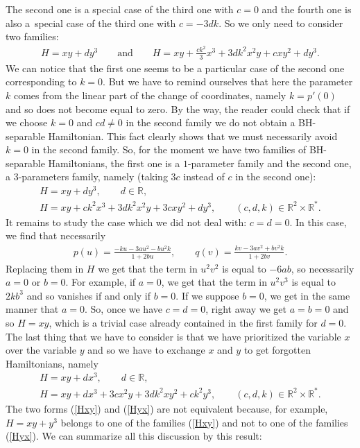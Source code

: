 \documentclass[10pt,a4paper]{amsart}
\numberwithin{equation}{section}
\begin{document}
The second one is a special case of the third one with $c=0$ and the fourth one is also a~special case of the third one with $c=-3dk$. So we only need to consider two families:
\begin{gather*}
H=xy+dy^3\qquad \text{and}\qquad H=xy+\frac{ck^2}{3}x^3+3dk^2x^2y+cxy^2+dy^3.
\end{gather*}
We can notice that the first one seems to be a particular case of the second one corresponding to $k=0$. But we have to remind ourselves that here the parameter $k$ comes from the linear part of the change of coordinates, namely $k=p'(0)$ and so does not become equal to zero. By the way, the reader could check that if we choose $k=0$ and $cd\not=0$ in the second family we do not obtain a BH-separable Hamiltonian. This fact clearly shows that we must necessarily avoid $k=0$ in the second family.
So, for the moment we have two families of BH-separable Hamiltonians, the first one is a $1$-parameter family and the second one, a $3$-parameters family, namely (taking $3c$ instead of $c$ in the second one):
\begin{gather}
H=xy+dy^3,\qquad d\in\mathbb{R},\nonumber
\\
H=xy+ck^2x^3+3dk^2x^2y+3cxy^2+dy^3,\qquad (c,d,k)\in\mathbb{R}^2\times\mathbb{R}^*.\label{Hxy}
\end{gather}
It remains to study the case which we did not deal with: $c=d=0$.
In this case, we find that necessarily
\begin{gather*}
p(u)=\frac{-ku-3au^2-bu^2k}{1+2bu},\qquad q(v)=\frac{kv-3av^2+bv^2k}{1+2bv}.
\end{gather*}
Replacing them in $H$ we get that the term in $u^2v^2$ is equal to $-6ab$, so necessarily $a=0$ or $b=0$. For example, if $a=0$, we get that the term in $u^2v^3$ is equal to $2kb^3$ and so vanishes if and only if $b=0$. If we suppose $b=0$, we get in the same manner that $a=0$. So, once we have $c=d=0$, right away we get $a=b=0$ and so $H=xy$, which is a trivial case already contained in the first family for $d=0$.
The last thing that we have to consider is that we have prioritized the variable $x$ over the variable $y$ and so we have to exchange $x$ and $y$ to get forgotten Hamiltonians, namely
\begin{gather}
H=xy+dx^3,\qquad d\in\mathbb{R},\nonumber
\\
H=xy+dx^3+3cx^2y+3dk^2xy^2+ck^2y^3,\qquad (c,d,k)\in\mathbb{R}^2\times\mathbb{R}^*.\label{Hyx}
\end{gather}
The two forms (\ref{Hxy}) and (\ref{Hyx}) are not equivalent because, for example, $H=xy+y^3$ belongs to one of the families (\ref{Hxy}) and not to one of the families (\ref{Hyx}). We can summarize all this discussion by this result:
\end{document}

